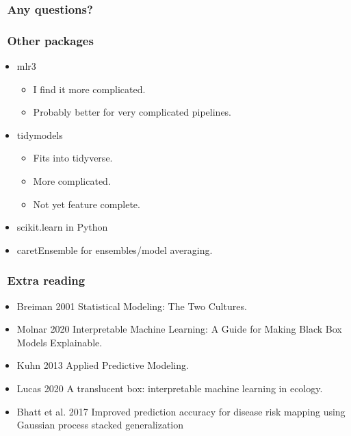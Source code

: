 \documentclass[handout, aspectratio = 169]{beamer}
\begin{document}
\begin{frame}
\frametitle{\insertframenumber~Any questions?}


\end{frame} 





\begin{frame}
\frametitle{\insertframenumber~Other packages}

\begin{itemize}
\item mlr3
	\begin{itemize}
	\item I find it more complicated. 
	\item Probably better for very complicated pipelines.
	\end{itemize}
\item tidymodels
	\begin{itemize}
	\item Fits into tidyverse.
	\item More complicated.
	\item Not yet feature complete.
	\end{itemize}
\item scikit.learn in Python
\item caretEnsemble for ensembles/model averaging.
\end{itemize}
\end{frame} 




\begin{frame}
\frametitle{\insertframenumber~Extra reading}

\begin{itemize}
\item Breiman 2001 Statistical Modeling: The Two Cultures.
\item Molnar 2020 Interpretable Machine Learning: A Guide for Making Black Box Models Explainable.
\item Kuhn 2013 Applied Predictive Modeling.
\item Lucas 2020 A translucent box: interpretable machine learning in ecology.
\item Bhatt et al. 2017 Improved prediction accuracy for disease risk mapping using Gaussian process stacked generalization
\end{itemize}
\end{frame} 
\end{document}
